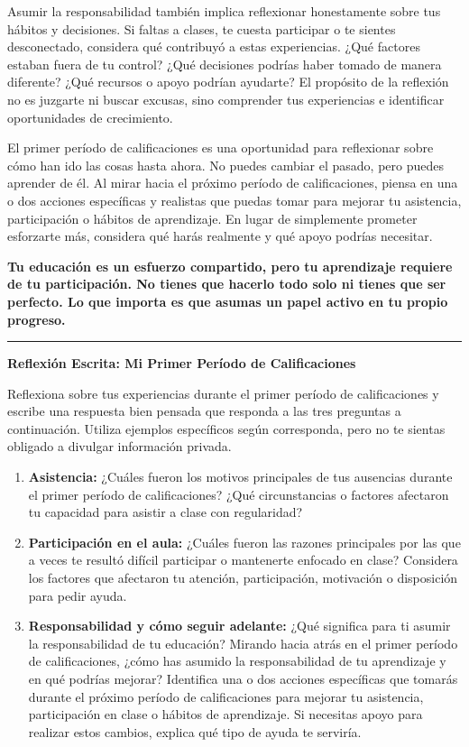 \documentclass[10pt]{article}
\begin{document}
Asumir la responsabilidad también implica reflexionar honestamente sobre
tus hábitos y decisiones. Si faltas a clases, te cuesta participar o te
sientes desconectado, considera qué contribuyó a estas experiencias.
¿Qué factores estaban fuera de tu control? ¿Qué decisiones podrías haber
tomado de manera diferente? ¿Qué recursos o apoyo podrían ayudarte? El
propósito de la reflexión no es juzgarte ni buscar excusas, sino comprender
tus experiencias e identificar oportunidades de crecimiento.

El primer período de calificaciones es una oportunidad para reflexionar
sobre cómo han ido las cosas hasta ahora. No puedes cambiar el pasado,
pero puedes aprender de él. Al mirar hacia el próximo período de
calificaciones, piensa en una o dos acciones específicas y realistas que
puedas tomar para mejorar tu asistencia, participación o hábitos de
aprendizaje. En lugar de simplemente prometer esforzarte más, considera
qué harás realmente y qué apoyo podrías necesitar.

\textbf{Tu educación es un esfuerzo compartido, pero tu aprendizaje requiere
de tu participación. No tienes que hacerlo todo solo ni tienes que ser
perfecto. Lo que importa es que asumas un papel activo en tu propio progreso.}

\vspace{3pt}
\hrule
\vspace{4pt}

{\large\bfseries Reflexión Escrita: Mi Primer Período de Calificaciones}

Reflexiona sobre tus experiencias durante el primer período de calificaciones y
escribe una respuesta bien pensada que responda a las tres preguntas a continuación.
Utiliza ejemplos específicos según corresponda, pero no te sientas obligado
a divulgar información privada.

\begin{enumerate}
    \item \textbf{Asistencia:} ¿Cuáles fueron los motivos principales de tus
    ausencias durante el primer período de calificaciones? ¿Qué circunstancias
    o factores afectaron tu capacidad para asistir a clase con regularidad?

    \item \textbf{Participación en el aula:} ¿Cuáles fueron las razones principales
    por las que a veces te resultó difícil participar o mantenerte enfocado
    en clase? Considera los factores que afectaron tu atención, participación,
    motivación o disposición para pedir ayuda.

    \item \textbf{Responsabilidad y cómo seguir adelante:} ¿Qué significa para ti
    asumir la responsabilidad de tu educación? Mirando hacia atrás en el
    primer período de calificaciones, ¿cómo has asumido la responsabilidad de tu
    aprendizaje y en qué podrías mejorar? Identifica una o dos acciones específicas
    que tomarás durante el próximo período de calificaciones para mejorar tu
    asistencia, participación en clase o hábitos de aprendizaje. Si necesitas
    apoyo para realizar estos cambios, explica qué tipo de ayuda te serviría.
\end{enumerate}
\end{document}
